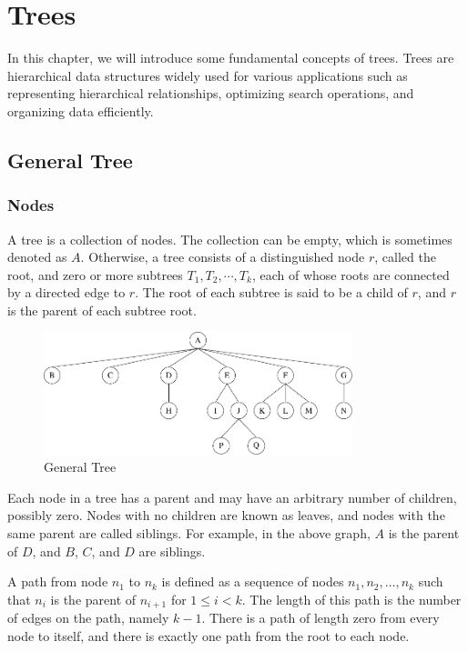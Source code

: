 \chapter{Trees}
In this chapter, we will introduce some fundamental concepts of trees. Trees are hierarchical data structures widely used for various applications such as representing hierarchical relationships, optimizing search operations, and organizing data efficiently. 

\section{General Tree}
\subsection{Nodes}
\begin{minipage}{0.4\textwidth}
A tree is a collection of nodes. The collection can be empty, which is sometimes denoted as \(A\). Otherwise, a tree consists of a distinguished node \(r\), called the root, and zero or more subtrees \(T_1, T_2, \cdots, T_k\), each of whose roots are connected by a directed edge to \(r\). The root of each subtree is said to be a child of \(r\), and \(r\) is the parent of each subtree root.
\end{minipage}
\begin{minipage}{0.6\textwidth}
\begin{figure}[H]
  \centering
  \includegraphics[width=0.8\textwidth]{Figure/General-Tree.pdf}
  \caption{General Tree}
\end{figure}
\end{minipage}

Each node in a tree has a parent and may have an arbitrary number of children, possibly zero. Nodes with no children are known as leaves, and nodes with the same parent are called siblings. For example, in the above graph, \(A\) is the parent of \(D\), and \(B\), \(C\), and \(D\) are siblings.

A path from node \(n_1\) to \(n_k\) is defined as a sequence of nodes \(n_1, n_2, \dots, n_k\) such that \(n_i\) is the parent of \(n_{i+1}\) for \(1 \leq i < k\). The length of this path is the number of edges on the path, namely \(k - 1\). There is a path of length zero from every node to itself, and there is exactly one path from the root to each node.

